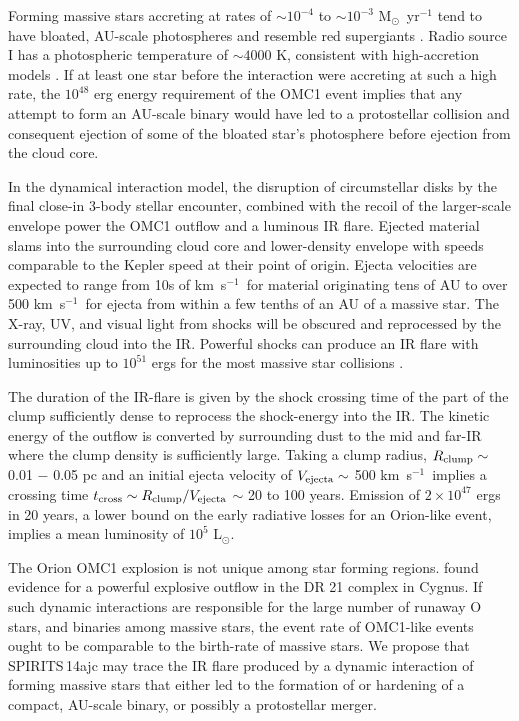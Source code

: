 \documentclass[twocolumn,times]{aastex6}
\newcommand{\kms}{km~s{$^{-1}$}}
\newcommand{\Lsol}{L$_{\odot}$}
\newcommand{\Msol}{M$_{\odot}$}
\begin{document}
Forming massive stars accreting at rates of $\sim 10^{-4}$ to $\sim 10^{-3}$ \Msol\  yr$^{-1}$
tend to have bloated, AU-scale photospheres and resemble red supergiants
\citep{HosokawaOmukai2009}.    Radio source I has a photospheric temperature of
$\sim 4000$ K, consistent with high-accretion models \citep{Testi2010}.    If at least
one star before the interaction were accreting at such a high rate,  the $10^{48}$ erg
energy requirement of the OMC1 event implies that any attempt to form an AU-scale 
binary would have led to a protostellar collision and consequent ejection of some of the
bloated star's photosphere before ejection from the cloud core.

In the dynamical interaction model, the disruption of circumstellar disks by the final close-in 
3-body stellar encounter, combined with the recoil of the larger-scale envelope 
power the OMC1 outflow and a luminous IR flare.    Ejected material  slams into 
the surrounding cloud core and lower-density envelope with speeds 
comparable to the Kepler speed at their point of origin.  Ejecta velocities 
are expected to range from  10s of \kms\ for material originating tens of AU to over 
500 \kms\ for ejecta from within a few tenths of an AU of a massive star.  The X-ray, UV, 
and visual light from shocks will be obscured and reprocessed by the surrounding  
cloud into the IR.   Powerful shocks can produce
an IR  flare with luminosities up to $10^{51}$ ergs for the most massive star 
collisions \citep{BallyZinnecker2005}. 

The duration of the IR-flare is given by the shock crossing  time of the part of 
the clump  sufficiently dense to reprocess the shock-energy into the IR.
The kinetic energy of the outflow is converted by surrounding dust
to the mid and far-IR where the clump density is sufficiently large. 
Taking a clump radius, $R_{\rm clump} \sim$ 0.01 $-$ 0.05 pc and an initial ejecta velocity of 
$V_{\rm ejecta} \sim$ 500 \kms\  implies a crossing time 
$t_{\rm cross} \sim R_{\rm clump} / V_{\rm ejecta}$
$\sim$ 20 to 100 years.   Emission of $2 \times 10^{47}$ ergs in 20 years, a lower bound 
on the early radiative losses for an Orion-like event, implies a mean
luminosity of $10^5$ \Lsol .

The Orion OMC1 explosion is not unique among star forming regions.  
\citet{Zapata2013} found evidence for a powerful explosive outflow in the DR 21 complex  
in Cygnus.    If such dynamic interactions are responsible for  the large number 
of runaway O stars, and binaries among massive stars, the event rate of OMC1-like 
events ought to be comparable to the birth-rate of massive stars.  We propose that
SPIRITS\,14ajc may trace the IR flare produced by a dynamic interaction of
forming massive stars that either led to the formation of or hardening of a compact, AU-scale
binary, or possibly a protostellar merger.
\end{document}
